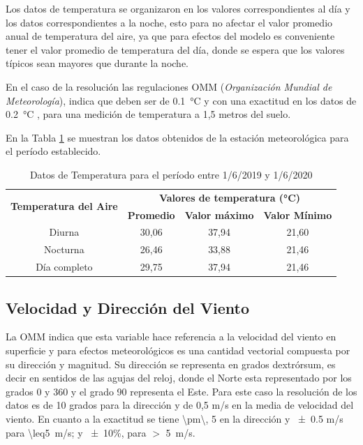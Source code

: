 Los datos de temperatura se organizaron en los valores correspondientes al día y los datos correspondientes a la noche, esto para no afectar el valor promedio anual de temperatura del aire, ya que para efectos del modelo es conveniente tener el valor promedio de temperatura del día, donde se espera que los valores típicos sean mayores que durante la noche.

En el caso de la resolución las regulaciones OMM (\textit{Organización Mundial de Meteorología}), indica que deben ser de \SI{0,1}{\celsius} y con una exactitud en los datos de \SI{0,2}{\celsius} , para una medición de temperatura a 1,5 metros del suelo. \cite{ots_manual}

En la Tabla \ref{temperatura_met} se muestran los datos obtenidos de la estación meteorológica para el período establecido.

\begin{table}[H]
\centering
\caption{Datos de Temperatura para el período entre 1/6/2019 y 1/6/2020}
\label{temperatura_met}
\begin{tabular}{cccc}
\toprule
\multicolumn{1}{c}{\multirow{2}{*}{\textbf{Temperatura del Aire}}} & \multicolumn{3}{c}{\textbf{Valores de temperatura (\si{\celsius})}}           \\ \cline{2-4} 
\multicolumn{1}{c}{}                                & \textbf{Promedio} & \textbf{Valor máximo} & \textbf{Valor Mínimo} \\ \hline
Diurna         & 30,06 & 37,94 & 21,60 \\
Nocturna     & 26,46 & 33,88 & 21,46 \\
Día completo & 29,75 & 37,94 & 21,46 \\ \bottomrule
\end{tabular}
\end{table}

\subsection{Velocidad y Dirección del Viento}

La OMM indica que esta variable hace referencia a la velocidad del viento en superficie y para efectos meteorológicos es una cantidad vectorial compuesta por su dirección y magnitud. Su dirección se representa en grados dextrórsum, es decir en sentidos de las agujas del reloj, donde el Norte esta representado por los grados 0 y 360 y el grado 90 representa el Este. Para este caso la resolución de los datos es de 10 grados para la dirección y de 0,5 \si{\meter/\second} en la media de velocidad del viento. En cuanto a la exactitud se tiene \num{\pm\, 5}{\degree} en la dirección y \num{\pm0,5} \si{\meter/\second}\; para \SI{\leq5}{\meter/\second}; y \num{\pm10}\si{\percent}, para $>$ \SI{5}{\meter/\second}.\cite{ots_manual}


